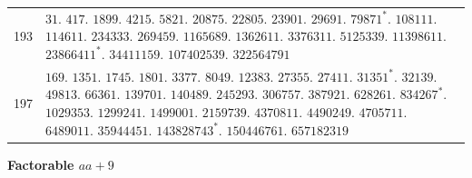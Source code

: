 \begin{longtable}{@{}r|p{\dimexpr\linewidth-38pt\relax}@{}}
193 & $31.$ $417.$ $1899.$ $4215.$ $5821.$ $20875.$ $22805.$ $23901.$ $29691.$ $79871^{*}.$ $108111.$ $114611.$ $234333.$ $269459.$ $1165689.$ $1362611.$ $3376311.$ $5125339.$ $11398611.$ $23866411^{*}.$ $34411159.$ $107402539.$ $322564791$\\
197 & $169.$ $1351.$ $1745.$ $1801.$ $3377.$ $8049.$ $12383.$ $27355.$ $27411.$ $31351^{*}.$ $32139.$ $49813.$ $66361.$ $139701.$ $140489.$ $245293.$ $306757.$ $387921.$ $628261.$ $834267^{*}.$ $1029353.$ $1299241.$ $1499001.$ $2159739.$ $4370811.$ $4490249.$ $4705711.$ $6489011.$ $35944451.$ $143828743^{*}.$ $150446761.$ $657182319$\\
\end{longtable}\endgroup
\par\medskip{}
\centerline{\textbf{Factorable $aa+9$}}\nobreak\smallskip
\begingroup\small\setlength{\tabcolsep}{4pt}
